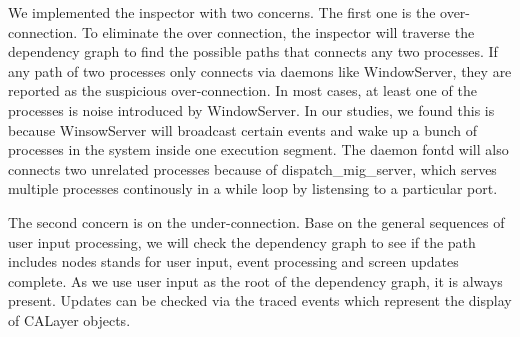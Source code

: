 We implemented the inspector with two concerns.
The first one is the over-connection.
To eliminate the over connection, the inspector will traverse the dependency graph to find the possible paths that connects any two processes.
If any path of two processes only connects via daemons like WindowServer, they are reported as the suspicious over-connection.
In most cases, at least one of the processes is noise introduced by WindowServer.
In our studies, we found this is because WinsowServer will broadcast certain events and wake up a bunch of processes in the system inside one execution segment.
The daemon fontd will also connects two unrelated processes because of dispatch\_mig\_server, which serves multiple processes continously in a while loop by listensing to a particular port. 
\par
The second concern is on the under-connection.
Base on the general sequences of user input processing, we will check the dependency graph to see if the path includes nodes stands for user input, event processing and screen updates complete.
As we use user input as the root of the dependency graph, it is always present.
Updates can be checked via the traced events which represent the display of CALayer objects.
